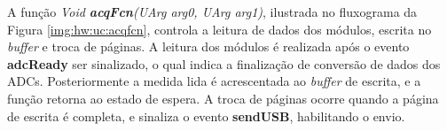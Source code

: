 	\iffalse
			\begin{figure}[h]
				\caption{Fluxograma da função \textit{adcRdy}}
				\label{img:hw:uc:adcrdy}
				\centering
				\begin{tikzpicture}[flow chart]
					\node (start)	[start]	{Inicio da\\Interrupção};
					\node (get)		[block, right=of start]	{Obtém\\Fonte da\\Interrupção};
					\node (post)	[block, right=of get]	{Posta\\Evento\\\textbf{adcReady}};
					\node (flag)	[block, right=of post]	{Limpa\\\textit{Flag} da\\Interrupção};
					\node (exit)	[start, right=of flag]	{Finaliza Interrupção};
				\end{tikzpicture}
			\end{figure}
	\fi


			A função \textit{Void \textbf{acqFcn}(UArg arg0, UArg arg1)}, ilustrada no fluxograma da Figura \ref{img:hw:uc:acqfcn}, controla a leitura de dados dos módulos, escrita no \textit{buffer} e troca de páginas. A leitura dos módulos é realizada após o evento \textbf{adcReady} ser sinalizado, o qual indica a finalização de conversão de dados dos ADCs. Posteriormente a medida lida é acrescentada ao \textit{buffer} de escrita, e a função retorna ao estado de espera. A troca de páginas ocorre quando a página de escrita é completa, e sinaliza o evento \textbf{sendUSB}, habilitando o envio.

